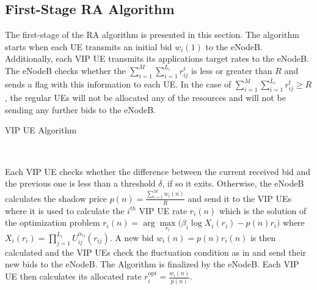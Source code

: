 \documentclass[journal]{IEEEtran} 				\IEEEoverridecommandlockouts 						\usepackage{amsmath,amssymb}
\begin{document}
\subsection{First-Stage RA Algorithm}\label{sec:UE_alloc_alg}
The first-stage of the RA algorithm is presented in this section. The algorithm starts when each UE transmits an initial bid $w_{i}(1)$ to the eNodeB. Additionally, each VIP UE transmits its applications target rates to the eNodeB. The eNodeB checks whether the $\sum_{i=1}^{M}\sum_{i=1}^{L_i}r_{ij}^{t}$ is less or greater than $R$ and sends a flag with this information to each UE. In the case of $\sum_{i=1}^{M}\sum_{i=1}^{L_i}r_{ij}^{t}\geq R$, the regular UEs will not be allocated any of the resources and will not be sending any further bids to the eNodeB.\begin{algorithm}\caption{VIP UE Algorithm} \label{alg:VIP_UE_first-stage}
\begin{algorithmic}
\LOOP
	 
			\ELSE
		\ENDIF
        \ENDWHILE
	 
			\ELSE
     \\
		\ENDIF
		\ENDIF
        \ENDWHILE
\ENDLOOP
\end{algorithmic}
\end{algorithm}
Each VIP UE checks whether the difference between the current received bid and the previous one is less than a threshold $\delta$, if so it exits. Otherwise, the eNodeB calculates the shadow price $p(n)=\frac{\sum_{i=1}^{M}w_{i}(n)}{R}$ and send it to the VIP UEs where it is used to calculate the $i^{th}$ VIP UE rate $r_{i}(n)$ which is the solution of the optimization problem $r_{i}(n)=\arg \underset{r_{i}}\max \Big(\beta_i \log X_i(r_{i})- p(n)r_{i}\Big)$ where $X_i(r_i) = \prod_{j=1}^{L_i}U_{ij}^{\alpha_{ij}}(r_{ij})$. A new bid $w_{i}(n)=p(n) r_{i}(n)$ is then calculated and the VIP UEs check the fluctuation condition as in \cite{Ahmed_Utility2} and send their new bids to the eNodeB. The Algorithm is finalized by the eNodeB. Each VIP UE then calculates its allocated rate $r_{i} ^{\text{opt}}=\frac{w_{i}(n)}{p(n)}$.
\end{document}
